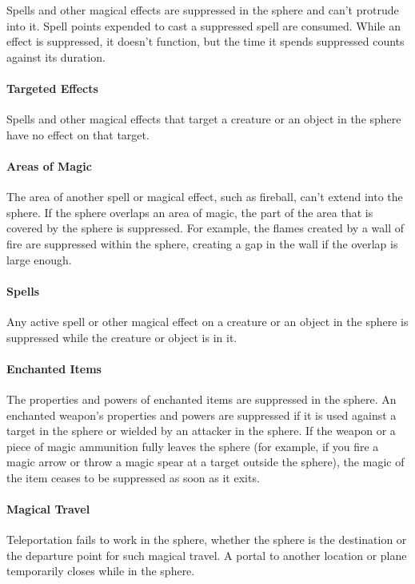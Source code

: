     Spells and other magical effects are suppressed in the sphere and can't protrude into it.
    Spell points expended to cast a suppressed spell are consumed.
    While an effect is suppressed, it doesn't function, but the time it spends suppressed counts against its duration.

    \paragraph{Targeted Effects}
    Spells and other magical effects that target a creature or an object in the sphere have no effect on that target.

    \paragraph{Areas of Magic}
    The area of another spell or magical effect, such as fireball, can't extend into the sphere.
    If the sphere overlaps an area of magic, the part of the area that is covered by the sphere is suppressed.
    For example, the flames created by a wall of fire are suppressed within the sphere, creating a gap in the wall if the overlap is large enough.

    \paragraph{Spells}
    Any active spell or other magical effect on a creature or an object in the sphere is suppressed while the creature or object is in it.

    \paragraph{Enchanted Items}
    The properties and powers of enchanted items are suppressed in the sphere.
    An enchanted weapon's properties and powers are suppressed if it is used against a target in the sphere or wielded by an attacker in the sphere.
    If the weapon or a piece of magic ammunition fully leaves the sphere (for example, if you fire a magic arrow or throw a magic spear at a target outside the sphere), the magic of the item ceases to be suppressed as soon as it exits.

    \paragraph{Magical Travel}
    Teleportation fails to work in the sphere, whether the sphere is the destination or the departure point for such magical travel.
    A portal to another location or plane  temporarily closes while in the sphere.

